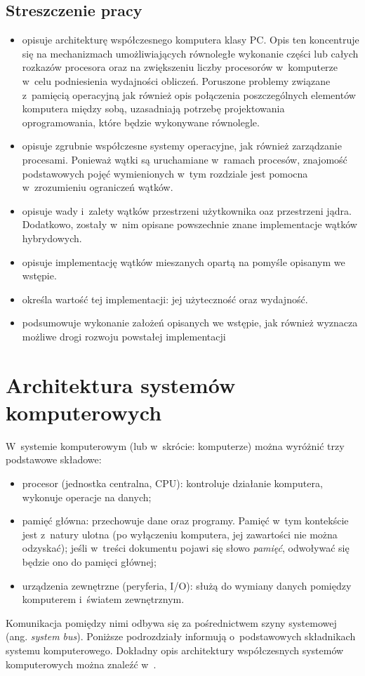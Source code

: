 \documentclass[12pt,makeidx]{mwart}
\begin{document}
\subsection{Streszczenie pracy}
\indent
	\begin{itemize}
	\item[Rozdział \ref{sec:architecture}] opisuje architekturę współczesnego komputera klasy PC. Opis ten koncentruje się na 
		mechanizmach umożliwiających równoległe wykonanie części lub całych rozkazów procesora oraz na zwiększeniu liczby procesorów
		w~komputerze w~celu podniesienia wydajności obliczeń. Poruszone problemy związane z~pamięcią operacyjną jak również opis połączenia
		poszczególnych elementów komputera między sobą, uzasadniają potrzebę projektowania oprogramowania, które będzie wykonywane równolegle.
	\item[Rozdział \ref{sec:system}] opisuje zgrubnie współczesne systemy operacyjne, jak również zarządzanie procesami. Ponieważ wątki są 
		uruchamiane w~ramach procesów, znajomość podstawowych pojęć wymienionych w~tym rozdziale jest pomocna w~zrozumieniu ograniczeń wątków.
	\item[Rozdział \ref{sec:threads}] opisuje wady i~zalety wątków przestrzeni użytkownika oaz przestrzeni jądra. Dodatkowo, zostały w~nim
		opisane powszechnie znane implementacje wątków hybrydowych.
	\item[Rozdział \ref{sec:solution}] opisuje implementację wątków mieszanych opartą na pomyśle opisanym we wstępie.
	\item[Rozdział \ref{sec:analysis}] określa wartość tej implementacji: jej użyteczność oraz wydajność.
	\item[Rozdział \ref{sec:summary}] podsumowuje wykonanie założeń opisanych we wstępie, jak również wyznacza możliwe drogi rozwoju
		powstałej implementacji
	\end{itemize}
\par
%
\newpage
\section{Architektura systemów komputerowych}
%
\label{sec:architecture}
\indent 
	W~systemie komputerowym (lub w~skrócie: komputerze) można wyróżnić trzy podstawowe składowe:
	\begin{itemize}
		\item procesor (jednostka centralna, CPU): kontroluje działanie komputera, wykonuje operacje na danych;
		\item pamięć główna: przechowuje dane oraz programy. Pamięć w~tym kontekście jest z~natury ulotna (po wyłączeniu komputera,
			jej zawartości nie można odzyskać); jeśli w~treści dokumentu pojawi się słowo \emph{pamięć}, odwoływać się będzie ono do
			pamięci głównej;
		\item urządzenia zewnętrzne (peryferia, I/O): służą do wymiany danych pomiędzy komputerem i~światem zewnętrznym.
	\end{itemize}
	Komunikacja pomiędzy nimi odbywa się za pośrednictwem szyny systemowej (ang. \emph{system bus}).
	Poniższe podrozdziały informują o~podstawowych składnikach systemu komputerowego. Dokładny opis architektury współczesnych
	systemów komputerowych można znaleźć w~\cite{hennessy}.
\par
%
\end{document}

